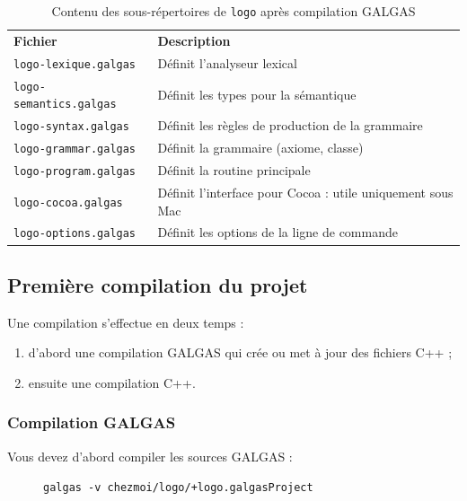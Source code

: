 \begin{table}[t]
  \centering
  \begin{tabular}{ll}
    \textbf{Fichier} & \textbf{Description}\\
    \texttt{logo-lexique.galgas} & Définit l'analyseur lexical\\
    \texttt{logo-semantics.galgas} & Définit les types pour la sémantique\\
    \texttt{logo-syntax.galgas} & Définit les règles de production de la grammaire \\
    \texttt{logo-grammar.galgas} & Définit la grammaire (axiome, classe) \\
    \texttt{logo-program.galgas} & Définit la routine principale \\
    \texttt{logo-cocoa.galgas} & Définit l’interface pour Cocoa : utile uniquement sous Mac \\
    \texttt{logo-options.galgas} & Définit les options de la ligne de commande \\
  \end{tabular}
  \caption{Contenu des sous-répertoires de \texttt{logo} après compilation GALGAS}
  \ligne
\end{table}






\subsection{Première compilation du projet}

Une compilation s'effectue en deux temps :
\begin{enumerate}
  \item d'abord une compilation GALGAS qui crée ou met à jour des fichiers C++ ;
  \item ensuite une compilation C++.
\end{enumerate}


\subsubsection{Compilation GALGAS}

Vous devez d'abord compiler les sources GALGAS :
\begin{description}
  \item[ ] \texttt{galgas -v chezmoi/logo/+logo.galgasProject}
\end{description}

